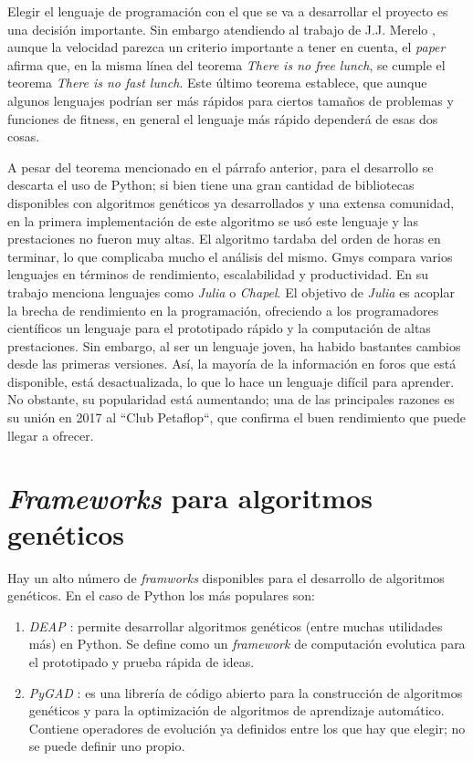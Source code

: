 Elegir el lenguaje de programación con el que se va a desarrollar el proyecto es una decisión importante. Sin embargo atendiendo al trabajo de J.J. Merelo \cite{fast_lunch}, aunque
la velocidad parezca un criterio importante a tener en cuenta, el \emph{paper} afirma que, en la misma línea del teorema \emph{There is no free lunch}, se cumple el teorema
\emph{There is no fast lunch}. Este último teorema establece, que aunque algunos lenguajes podrían ser más rápidos para ciertos tamaños de problemas y 
funciones de fitness, en general el lenguaje más rápido dependerá de esas dos cosas.

A pesar del teorema mencionado en el párrafo anterior, para el desarrollo se descarta el uso de Python; si bien tiene una gran cantidad de bibliotecas disponibles con algoritmos 
genéticos ya desarrollados y una extensa comunidad, en la primera implementación de este algoritmo se usó este lenguaje \cite{merelo_molina_2021} y las prestaciones no fueron muy altas. 
El algoritmo tardaba del orden de horas en terminar, lo que complicaba mucho el análisis del mismo. Gmys \cite{comparative_study} compara varios lenguajes en términos de rendimiento, 
escalabilidad y productividad. En su trabajo menciona lenguajes como \emph{Julia} o \emph{Chapel}. El objetivo de \emph{Julia} es acoplar la brecha de rendimiento en la programación, 
ofreciendo a los programadores científicos un lenguaje para el prototipado rápido y la computación de altas prestaciones. Sin embargo, al ser un lenguaje joven, ha habido bastantes
cambios desde las primeras versiones. Así, la mayoría de la información en foros que está disponible, está desactualizada, lo que lo hace un lenguaje difícil para aprender.
No obstante, su popularidad está aumentando; una de las principales razones es su unión en 2017 al ``Club Petaflop``, que confirma el buen rendimiento que puede llegar a ofrecer.  

\section{\textit{Frameworks} para algoritmos genéticos}

Hay un alto número de \emph{framworks} disponibles para el desarrollo de algoritmos genéticos. En el caso de Python los más populares son:

\begin{enumerate}
    \item \emph{DEAP} \cite{deap}: permite desarrollar algoritmos genéticos (entre muchas utilidades más) en Python. Se define como un \emph{framework}
    de computación evolutica para el prototipado y prueba rápida de ideas.
    \item \emph{PyGAD} \cite{pygad}: es una librería de código abierto para la construcción de algoritmos genéticos y para la optimización de algoritmos
    de aprendizaje automático. Contiene operadores de evolución ya definidos entre los que hay que elegir; no se puede definir uno propio.
\end{enumerate}

